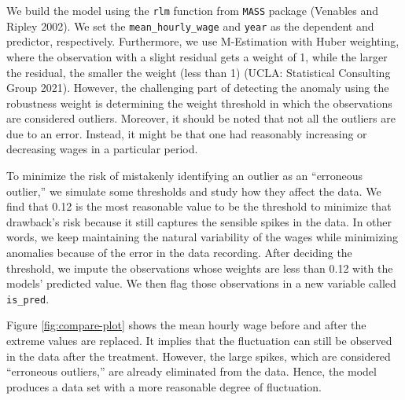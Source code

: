 \documentclass{article}
\begin{document}
We build the model using the \texttt{rlm} function from \texttt{MASS} package (Venables and Ripley 2002). We set the \texttt{mean\_hourly\_wage} and \texttt{year} as the dependent and predictor, respectively. Furthermore, we use M-Estimation with Huber weighting, where the observation with a slight residual gets a weight of 1, while the larger the residual, the smaller the weight (less than 1) (UCLA: Statistical Consulting Group 2021). However, the challenging part of detecting the anomaly using the robustness weight is determining the weight threshold in which the observations are considered outliers. Moreover, it should be noted that not all the outliers are due to an error. Instead, it might be that one had reasonably increasing or decreasing wages in a particular period.

To minimize the risk of mistakenly identifying an outlier as an ``erroneous outlier,'' we simulate some thresholds and study how they affect the data. We find that 0.12 is the most reasonable value to be the threshold to minimize that drawback's risk because it still captures the sensible spikes in the data. In other words, we keep maintaining the natural variability of the wages while minimizing anomalies because of the error in the data recording. After deciding the threshold, we impute the observations whose weights are less than 0.12 with the models' predicted value. We then flag those observations in a new variable called \texttt{is\_pred}.

Figure \ref{fig:compare-plot} shows the mean hourly wage before and after the extreme values are replaced. It implies that the fluctuation can still be observed in the data after the treatment. However, the large spikes, which are considered ``erroneous outliers,'' are already eliminated from the data. Hence, the model produces a data set with a more reasonable degree of fluctuation.
\end{document}
